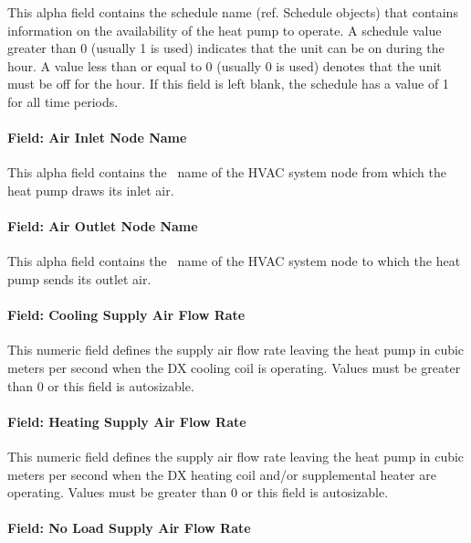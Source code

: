 This alpha field contains the schedule name (ref. Schedule objects) that contains information on the availability of the heat pump to operate. A schedule value greater than 0 (usually 1 is used) indicates that the unit can be on during the hour. A value less than or equal to 0 (usually 0 is used) denotes that the unit must be off for the hour. If this field is left blank, the schedule has a value of 1 for all time periods.

\paragraph{Field: Air Inlet Node Name}\label{field-air-inlet-node-name-007}

This alpha field contains the~ name of the HVAC system node from which the heat pump draws its inlet air.

\paragraph{Field: Air Outlet Node Name}\label{field-air-outlet-node-name-006}

This alpha field contains the~ name of the HVAC system node to which the heat pump sends its outlet air.

\paragraph{Field: Cooling Supply Air Flow Rate}\label{field-cooling-supply-air-flow-rate-3-000}

This numeric field defines the supply air flow rate leaving the heat pump in cubic meters per second when the DX cooling coil is operating. Values must be greater than 0 or this field is autosizable.

\paragraph{Field: Heating Supply Air Flow Rate}\label{field-heating-supply-air-flow-rate-3-000}

This numeric field defines the supply air flow rate leaving the heat pump in cubic meters per second when the DX heating coil and/or supplemental heater are operating. Values must be greater than 0 or this field is autosizable.

\paragraph{Field: No Load Supply Air Flow Rate}\label{field-no-load-supply-air-flow-rate-3-000}

